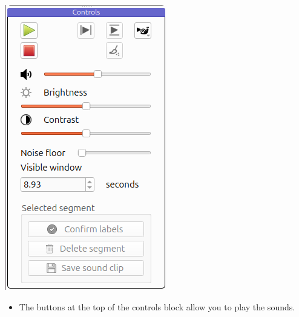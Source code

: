 \documentclass{article}
\begin{document}
\begin{center}
\includegraphics[width=.25\textwidth]{Figures/Controls.png}
\end{center}

\begin{itemize}
\item The buttons at the top of the controls block allow you to play the sounds. 


\end{itemize}
\end{document}
